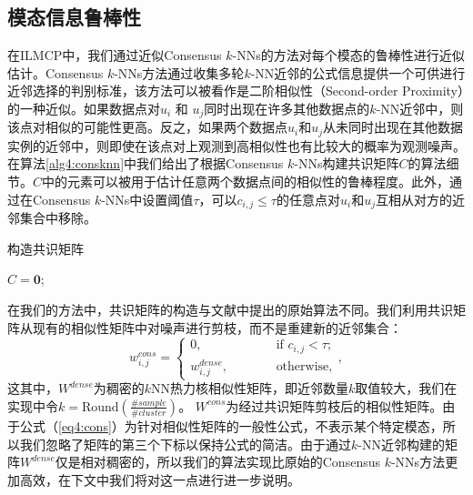 \subsection{模态信息鲁棒性}
在ILMCP中，我们通过近似Consensus $k$-NNs\cite{premachandran2013consensus}的方法对每个模态的鲁棒性进行近似估计。Consensus $k$-NNs方法通过收集多轮$k$-NN近邻的公式信息提供一个可供进行近邻选择的判别标准，该方法可以被看作是二阶相似性（Second-order Proximity）\cite{tang2015line,wang2016structural}的一种近似。如果数据点对$u_i$ 和 $u_j$同时出现在许多其他数据点的$k$-NN近邻中，则该点对相似的可能性更高。反之，如果两个数据点$u_i$和$u_j$从未同时出现在其他数据实例的近邻中，则即使在该点对上观测到高相似性也有比较大的概率为观测噪声。
在算法\ref{alg4:consknn}中我们给出了根据Consensus $k$-NNs构建共识矩阵$C$的算法细节。$C$中的元素可以被用于估计任意两个数据点间的相似性的鲁棒程度。此外，通过在Consensus $k$-NNs中设置阈值$\tau$，可以${c}_{i,j}\le\tau$的任意点对$u_i$和$u_j$互相从对方的近邻集合中移除。
\begin{algorithm}[tb]
            \caption{构造共识矩阵}
            \label{alg4:consknn}
            ${C} = \mathbf{0}$;
            \For {$i = 1:N$}{
                \ForAll {$u_j, u_k$满足$u_j, u_k \in \mathcal{N}_k(u_i)$}{
                    ${c}_{j,k} = {c}_{j,k}+1$\;
                    ${c}_{k,j} = {c}_{k,j}+1$\;
                }
            }
\end{algorithm}

在我们的方法中，共识矩阵的构造与文献\parencite{premachandran2013consensus}中提出的原始算法不同。我们利用共识矩阵从现有的相似性矩阵中对噪声进行剪枝，而不是重建新的近邻集合：
\begin{equation}
{w}^{cons}_{i,j} = 
\begin{cases}
0,\quad\qquad\qquad&\text{if }{c}_{i,j}<\tau;\\ {w}^{dense}_{i,j},&\text{otherwise,}
\end{cases},
\label{eq4:cons}
\end{equation}
这其中，${W}^{dense}$为稠密的$k$NN热力核相似性矩阵，即近邻数量$k$取值较大，我们在实现中令$k = \mathrm{Round}( \frac{\#sample}{\#cluster})$。 ${W}^{cons}$为经过共识矩阵剪枝后的相似性矩阵。由于公式（\ref{eq4:cons}）为针对相似性矩阵的一般性公式，不表示某个特定模态，所以我们忽略了矩阵的第三个下标以保持公式的简洁。由于通过$k$-NN近邻构建的矩阵${W}^{dense}$仅是相对稠密的，所以我们的算法实现比原始的Consensus $k$-NNs方法更加高效，在下文中我们将对这一点进行进一步说明。

